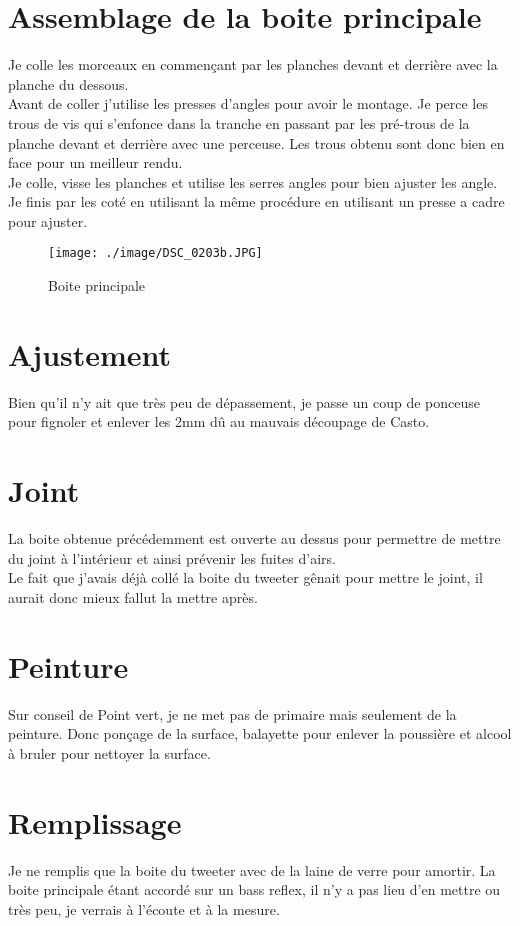 \documentclass[a4paper,english]{report}
\begin{document}
			\section{Assemblage de la boite principale}
			Je colle les morceaux en commençant par les planches devant et derrière avec la planche du dessous.\\ Avant de coller j'utilise les presses d'angles pour avoir le montage. Je perce les trous de vis qui s'enfonce dans la tranche en passant par les pré-trous de la planche devant et derrière avec une perceuse. Les trous obtenu sont donc bien en face pour un meilleur rendu.\\
			Je colle, visse les planches et utilise les serres angles pour bien ajuster les angle.\\
			Je finis par les coté en utilisant la même procédure en utilisant un presse a cadre pour ajuster.
				\begin{figure}[H]
					\centering
					\texttt{[image: ./image/DSC\_0203b.JPG]}
					\label{Boite principlae}
					\caption{Boite principale}
				\end{figure}			
			 
			\section{Ajustement}
			Bien qu'il n'y ait que très peu de dépassement, je passe un coup de ponceuse pour fignoler et enlever les 2mm dû au mauvais découpage de Casto.
			\section{Joint}
			La boite obtenue précédemment est ouverte au dessus pour permettre de mettre du joint à l'intérieur et ainsi prévenir les fuites d'airs.\\
			Le fait que j'avais déjà collé la boite du tweeter gênait pour mettre le joint, il aurait donc mieux fallut la mettre après. 
			\section{Peinture}
			Sur conseil de Point vert, je ne met pas de primaire mais seulement de la peinture. Donc ponçage de la surface, balayette pour enlever la poussière et alcool à bruler pour nettoyer la surface.
			\section{Remplissage}
			Je ne remplis que la boite du tweeter avec de la laine de verre pour amortir. La boite principale étant accordé sur un bass reflex, il n'y a pas lieu d'en mettre ou très peu, je verrais à l'écoute et à la mesure.
\end{document}
